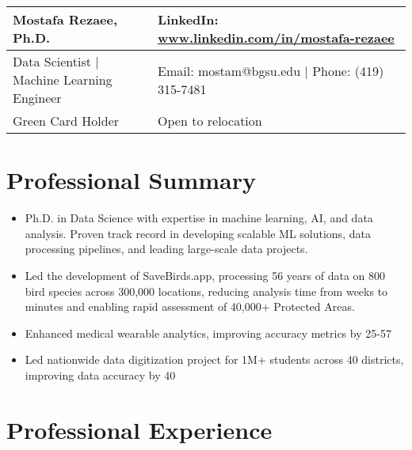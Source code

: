 \documentclass[a4paper,10pt]{article}
\begin{document}
\noindent

\begin{tabular}{@{}p{3.5in} p{3.5in}@{}}

    {\bfseries\LARGE Mostafa Rezaee, Ph.D.} & \hfill LinkedIn: \href{https://www.linkedin.com/in/mostafa-rezaee/}{www.linkedin.com/in/mostafa-rezaee} \\
    
    \hline 
    
    Data Scientist | Machine Learning Engineer & \hfill Email: mostam@bgsu.edu | Phone: (419) 315-7481 \\
    Green Card Holder & \hfill Open to relocation

\end{tabular}

\section*{Professional Summary}

\begin{itemize}
    \item Ph.D. in Data Science with expertise in machine learning, AI, and data analysis. Proven track record in developing scalable ML solutions, data processing pipelines, and leading large-scale data projects.
    
    \item Led the development of SaveBirds.app, processing 56 years of data on 800 bird species across 300,000 locations, reducing analysis time from weeks to minutes and enabling rapid assessment of 40,000+ Protected Areas.
    
    \item Enhanced medical wearable analytics, improving accuracy metrics by 25-57%
    
    \item Led nationwide data digitization project for 1M+ students across 40 districts, improving data accuracy by 40%
\end{itemize}

\section*{Professional Experience}
\end{document}
